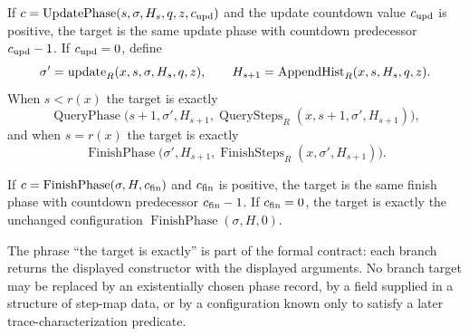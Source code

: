 \begin{definition}
  If $c=\operatorname{UpdatePhase}(s,\sigma,H_s,q,z,c_{\rm upd})$ and the
  update countdown value $c_{\rm upd}$ is positive, the target is the same
  update phase with countdown predecessor $c_{\rm upd}-1$.  If
  $c_{\rm upd}=0$, define
  \[
    \sigma'=\operatorname{update}_R(x,s,\sigma,H_s,q,z),
    \qquad
    H_{s+1}=\operatorname{AppendHist}_R(x,s,H_s,q,z).
  \]
  When $s<r(x)$ the target is exactly
  \[
    \operatorname{QueryPhase}
      \bigl(s+1,\sigma',H_{s+1},
        \operatorname{QuerySteps}_R(x,s+1,\sigma',H_{s+1})\bigr),
  \]
  and when $s=r(x)$ the target is exactly
  \[
    \operatorname{FinishPhase}
      \bigl(\sigma',H_{s+1},
        \operatorname{FinishSteps}_R(x,\sigma',H_{s+1})\bigr).
  \]

  If $c=\operatorname{FinishPhase}(\sigma,H,c_{\rm fin})$ and
  $c_{\rm fin}$ is positive, the target is the same finish phase with
  countdown predecessor $c_{\rm fin}-1$.  If $c_{\rm fin}=0$, the target is
  exactly the unchanged configuration
  $\operatorname{FinishPhase}(\sigma,H,0)$.

  The phrase ``the target is exactly'' is part of the formal contract: each
  branch returns the displayed constructor with the displayed arguments.  No
  branch target may be replaced by an existentially chosen phase record, by a
  field supplied in a structure of step-map data, or by a configuration known
  only to satisfy a later trace-characterization predicate.
\end{definition}


